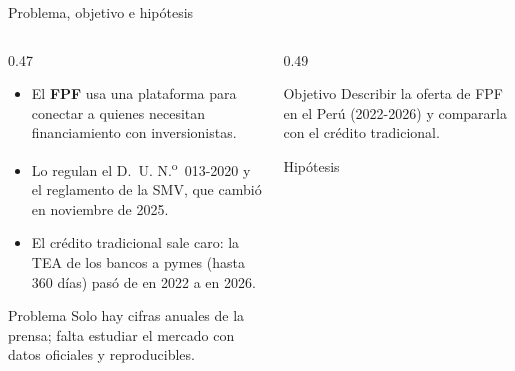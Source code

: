\begin{frame}{Problema, objetivo e hipótesis}
  \begin{columns}[t]
    \begin{column}{0.47\textwidth}
      \par\vspace{0.1cm}
      \begin{itemize}\footnotesize
        \item El \textbf{FPF} usa una plataforma para conectar a quienes necesitan financiamiento con inversionistas.
        \item Lo regulan el D.~U. N.\textsuperscript{o}~013-2020 y el reglamento de la SMV, que cambió en noviembre de 2025.
        \item El crédito tradicional sale caro: la TEA de los bancos a pymes (hasta 360 días) pasó de  en 2022 a  en 2026.
      \end{itemize}
      \begin{tarjeta}{Problema}
        Solo hay cifras anuales de la prensa; falta estudiar el mercado con datos oficiales y reproducibles.
      \end{tarjeta}
    \end{column}
    \begin{column}{0.49\textwidth}
      \begin{destacada}{Objetivo}
        Describir la oferta de FPF en el Perú (2022-2026) y compararla con el crédito tradicional.
      \end{destacada}
      \begin{tarjeta}{Hipótesis}
      \end{tarjeta}
    \end{column}
  \end{columns}
\end{frame}

